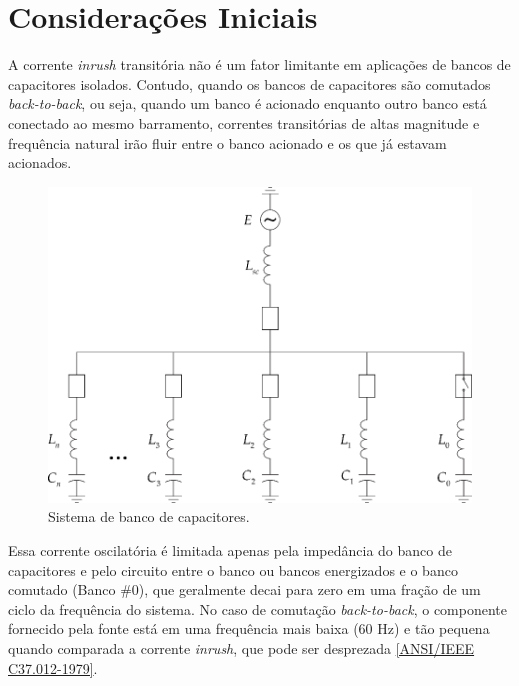 \documentclass[a4paper]{article}
\begin{document}
	
	
\section{Considerações Iniciais}

A corrente \textit{inrush} transitória não é um fator limitante em aplicações de bancos de capacitores isolados. Contudo, quando os bancos de capacitores são comutados \textit{back-to-back}, ou seja, quando um banco é acionado enquanto outro banco está conectado ao mesmo barramento, correntes transitórias de altas magnitude e frequência natural irão fluir entre o banco acionado e os que já estavam acionados.

	
\begin{figure}[!hbp]
	\centering
	\includegraphics{Picture1.png}
	\caption{Sistema de banco de capacitores.}
	\label{fig:picture1}
\end{figure}


Essa corrente oscilatória é limitada apenas pela impedância do banco de capacitores e pelo circuito entre o banco ou bancos energizados e o banco comutado (Banco \#0), que geralmente decai para zero em uma fração de um ciclo da frequência do sistema. No caso de comutação \textit{back-to-back}, o componente fornecido pela fonte está em uma frequência mais baixa (60 Hz) e tão pequena quando comparada a corrente \textit{inrush}, que pode ser desprezada \href{https://ieeexplore.ieee.org/document/7035261}{[ANSI/IEEE C37.012-1979]}.
\end{document}
